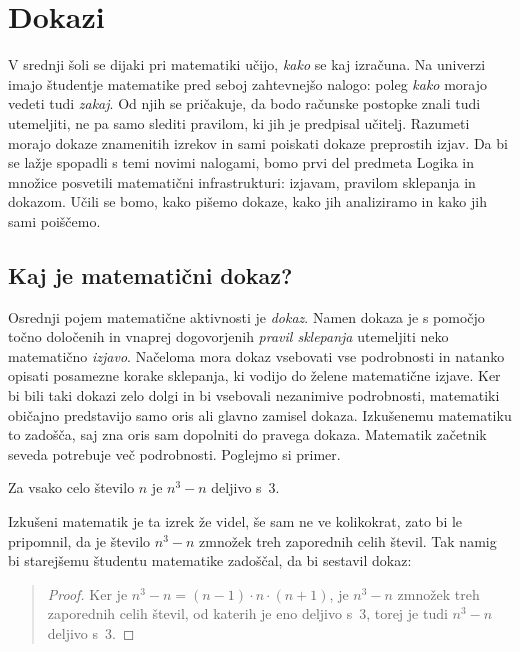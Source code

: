 \chapter{Dokazi}
\label{chap:dokazi}

V srednji šoli se dijaki pri matematiki učijo, \emph{kako} se kaj
izračuna. Na univerzi imajo študentje matematike pred seboj
zahtevnejšo nalogo: poleg \emph{kako} morajo vedeti tudi \emph{zakaj}.
Od njih se pričakuje, da bodo računske postopke znali tudi utemeljiti,
ne pa samo slediti pravilom, ki jih je predpisal učitelj. Razumeti
morajo dokaze znamenitih izrekov in sami poiskati dokaze preprostih
izjav. Da bi se lažje spopadli s temi novimi nalogami, bomo prvi del
predmeta Logika in množice posvetili matematični infrastrukturi:
izjavam, pra\-vi\-lom sklepanja in dokazom. Učili se bomo, kako pišemo
dokaze, kako jih analiziramo in kako jih sami poiščemo.

\section{Kaj je matematični dokaz?}
\label{sec:kaj-je-dokaz}

Osrednji pojem matematične aktivnosti je \emph{dokaz}. Namen dokaza je
s pomočjo točno določenih in vnaprej dogovorjenih \emph{pravil
  sklepanja} utemeljiti neko matematično \emph{izjavo}. Načeloma mora
dokaz vsebovati vse podrobnosti in natanko opisati posamezne korake
sklepanja, ki vodijo do želene matematične izjave. Ker bi bili taki
dokazi zelo dolgi in bi vsebovali nezanimive podrobnosti, matematiki
običajno predstavijo samo oris ali glavno zamisel dokaza. Izkušenemu
matematiku to zadošča, saj zna oris sam dopolniti do pravega dokaza.
Matematik začetnik seveda potrebuje več podrobnosti. Poglejmo si
primer.

\begin{izrek}
  \label{izr:n3-n-deljivo-3}
  Za vsako celo število $n$ je $n^3 - n$ deljivo s~$3$.
\end{izrek}

\noindent
Izkušeni matematik je ta izrek že videl, še sam ne ve kolikokrat,
zato bi le pripomnil, da je število $n^3 - n$ zmnožek treh zaporednih
celih števil.
%
Tak namig bi starejšemu študentu matematike zadoščal, da bi sestavil dokaz:

\begin{quote}
  \begin{proof}
    Ker je $n^3 - n = (n-1) \cdot n \cdot (n+1)$, je $n^3 - n$ zmnožek
    treh zaporednih celih števil, od katerih je eno deljivo s~$3$,
    torej je tudi $n^3 - n$ deljivo s~$3$.
  \end{proof}
\end{quote}

